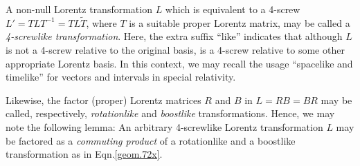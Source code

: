 A non-null Lorentz transformation $L$ which is 
equivalent to a 4-screw  $L'=TLT^{-1}=TL\tilde{T}$, 
where $T$ is a suitable proper Lorentz matrix, may be 
called a  \textsl{4-screwlike transformation}. 
 Here, the 
extra suffix ``like''  indicates that although $L$ is 
not a 4-screw relative to the original basis, is a 
4-screw relative to some other appropriate Lorentz 
basis. In this context, we may  recall the usage 
``spacelike and timelike''  for vectors and intervals 
in special relativity.  

   
Likewise, the factor (proper) Lorentz matrices $R$ and 
$B$ in $L=RB=BR$ may be called,  respectively, 
\textsl{rotationlike} and \textsl{boostlike} 
transformations. Hence, we may note the following 
lemma:
\Lem An arbitrary 4-screwlike Lorentz transformation 
$L$  may be factored as a \textsl{commuting product} 
of 
a rotationlike and a boostlike transformation as in 
Eqn.\eqref{geom.72x}.

